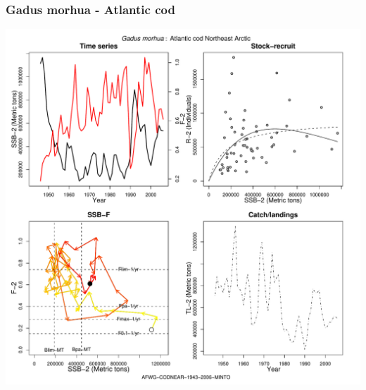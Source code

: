 \subsubsection{Gadus morhua - Atlantic cod}
\begin{center}
\includegraphics[width=1.2\textwidth]{../R/figures/AFWG-CODNEAR-1943-2006-MINTO.pdf}
\end{center}

